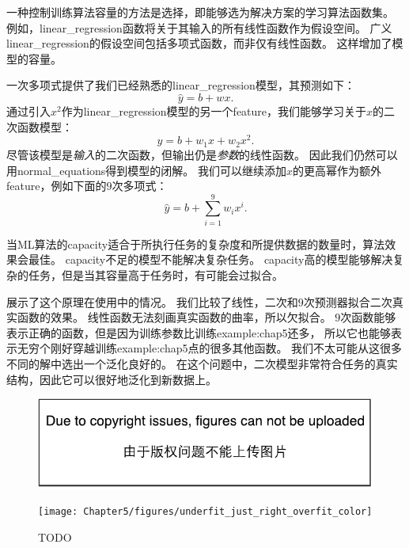一种控制训练算法容量的方法是选择，即能够选为解决方案的学习算法函数集。
例如，\gls{linear_regression}函数将关于其输入的所有线性函数作为假设空间。
广义\gls{linear_regression}的假设空间包括多项式函数，而非仅有线性函数。
这样增加了模型的容量。

一次多项式提供了我们已经熟悉的\gls{linear_regression}模型，其预测如下：
\begin{equation}
    \hat{y} = b + wx.
\end{equation}
通过引入$x^2$作为\gls{linear_regression}模型的另一个\gls{feature}，我们能够学习关于$x$的二次函数模型：
\begin{equation}
    \hat{y} = b + w_1x + w_2x^2.
\end{equation}
尽管该模型是\emph{输入}的二次函数，但输出仍是\emph{参数}的线性函数。
因此我们仍然可以用\gls{normal_equations}得到模型的闭解。
我们可以继续添加$x$的更高幂作为额外\gls{feature}，例如下面的$9$次多项式：
\begin{equation}
    \hat{y} = b + \sum_{i=1}^9 w_i x^i.
\end{equation}

当\gls{ML}算法的\gls{capacity}适合于所执行任务的复杂度和所提供数据的数量时，算法效果会最佳。
\gls{capacity}不足的模型不能解决复杂任务。
\gls{capacity}高的模型能够解决复杂的任务，但是当其容量高于任务时，有可能会过拟合。

展示了这个原理在使用中的情况。
我们比较了线性，二次和$9$次预测器拟合二次真实函数的效果。
线性函数无法刻画真实函数的曲率，所以欠拟合。
$9$次函数能够表示正确的函数，但是因为训练参数比训练\gls{example:chap5}还多， 所以它也能够表示无穷个刚好穿越训练\gls{example:chap5}点的很多其他函数。
我们不太可能从这很多不同的解中选出一个泛化良好的。
在这个问题中，二次模型非常符合任务的真实结构，因此它可以很好地泛化到新数据上。

\begin{figure}[!htb]
\ifOpenSource
\centerline{\includegraphics{figure.pdf}}
\else
\centerline{\texttt{[image: Chapter5/figures/underfit\_just\_right\_overfit\_color]}}
\fi
\caption{TODO}
\label{fig:chap5_underfit_just_right_overfit}
\end{figure}

